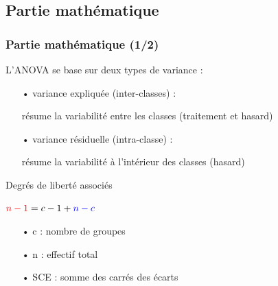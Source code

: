 \documentclass{beamer}
\begin{document}
\subsection{Partie mathématique}
\begin{frame}
\frametitle{Partie mathématique (1/2)}

L'ANOVA se base sur deux types de variance :
\begin{itemize}
\item[•] variance expliquée (inter-classes) : 
\item[]résume la variabilité entre les classes (traitement et hasard)
\item[•] variance résiduelle (intra-classe) : 
\item[] résume la variabilité à l'intérieur des classes (hasard)
\end{itemize}


\begin{block}{Degrés de liberté associés}
\begin{center}
$ \color{red} n-1 \color{black} = c-1 \color{black} + \color{blue} n-c $  
\end{center}         
\end{block}

\setlength{\columnsep}{-20pt}
\begin{multicols}{2}
\begin{itemize}
\item[•] c : nombre de groupes
\item[•] n : effectif total
\item[•] SCE : somme des carrés des écarts \\
\end{itemize}
\end{multicols}

\end{frame}
\end{document}
